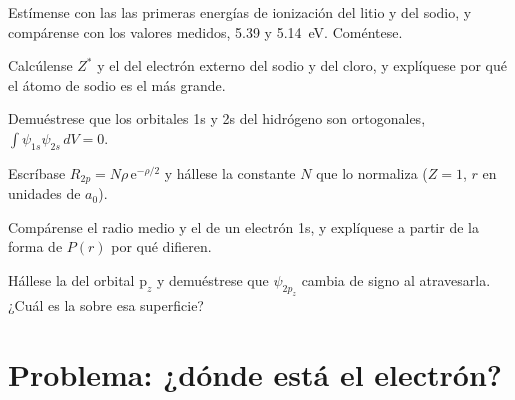 \begin{exercise}[$\star\star$]\label{exo:b2:atomic-orbitals:7}
Estímense con las  las primeras energías de ionización del litio y del sodio,
y compárense con los valores medidos, 5.39 y \qty{5.14}{eV}. Coméntese.
\end{exercise}

\begin{exercise}[$\star\star$]\label{exo:b2:atomic-orbitals:8}
Calcúlense $Z^*$ y el  del electrón externo del sodio y del
cloro, y explíquese por qué el átomo de sodio es el más grande.
\end{exercise}

\begin{exercise}[$\star\star$]\label{exo:b2:atomic-orbitals:9}
Demuéstrese que los orbitales 1s y 2s del hidrógeno son ortogonales,
$\int\psi_{1s}\psi_{2s}\,dV = 0$.
\end{exercise}

\begin{exercise}[$\star\star\star$]\label{exo:b2:atomic-orbitals:10}
Escríbase $R_{2p} = N\rho\,\mathrm e^{-\rho/2}$ y hállese la constante $N$ que lo normaliza
($Z = 1$, $r$ en unidades de $a_0$).
\end{exercise}

\begin{exercise}[$\star\star\star$]\label{exo:b2:atomic-orbitals:11}
Compárense el radio medio y el  de un electrón 1s, y
explíquese a partir de la forma de $P(r)$ por qué difieren.
\end{exercise}

\begin{exercise}[$\star\star\star$]\label{exo:b2:atomic-orbitals:12}
Hállese la  del orbital $\mathrm p_z$ y demuéstrese que $\psi_{2p_z}$
cambia de signo al atravesarla. ¿Cuál es la  sobre esa superficie?
\end{exercise}

\section{Problema: ¿dónde está el electrón?}

